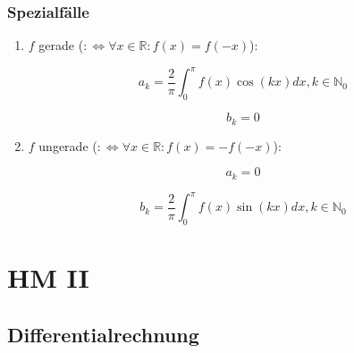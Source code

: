 \documentclass[]{article}
\begin{document}
			\subsubsection{Spezialfälle}
				
				\begin{enumerate}[]
				
					\item \begin{math} f \end{math} gerade (\begin{math} :\Leftrightarrow \forall x \in \mathbb{R}: f(x) = f(-x) \end{math}):
					
						\begin{displaymath}
							a_k = \frac{2}{\pi} \int_{0}^{\pi} f(x) \cos(kx) dx, k \in \mathbb{N}_0
						\end{displaymath}
					
						\begin{displaymath}
							b_k = 0
						\end{displaymath}
					
					\item \begin{math} f \end{math} ungerade (\begin{math} :\Leftrightarrow \forall x \in \mathbb{R}: f(x) = -f(-x) \end{math}):
					
						\begin{displaymath}
							a_k = 0
						\end{displaymath}
						
						\begin{displaymath}
							b_k = \frac{2}{\pi} \int_{0}^{\pi} f(x) \sin(kx) dx, k \in \mathbb{N}_0
						\end{displaymath}
						
									
				\end{enumerate}
	
	\clearpage
			
	\section{HM II}
	
		\subsection{Differentialrechnung}
			
\end{document}

